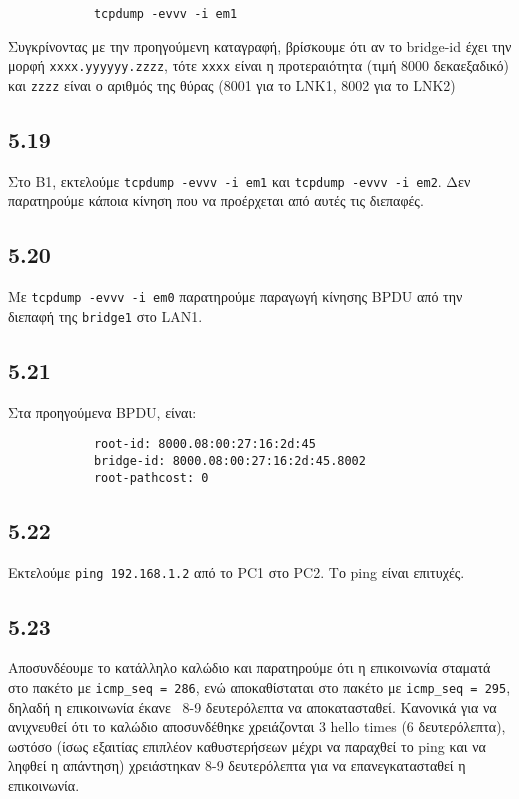 \documentclass[a4paper, 12pt]{article}
\begin{document}
		\begin{verbatim}
			tcpdump -evvv -i em1
		\end{verbatim}
		
		Συγκρίνοντας με την προηγούμενη καταγραφή, βρίσκουμε ότι αν το bridge-id έχει την μορφή \verb|xxxx.yyyyyy.zzzz|, τότε \verb|xxxx| είναι η προτεραιότητα (τιμή 8000 δεκαεξαδικό) και \verb|zzzz| είναι ο αριθμός της θύρας (8001 για το LNK1, 8002 για το LNK2)

	\subsection*{5.19}
		Στο B1, εκτελούμε \verb|tcpdump -evvv -i em1| και \verb|tcpdump -evvv -i em2|. Δεν παρατηρούμε κάποια κίνηση που να προέρχεται από αυτές τις διεπαφές.

	\subsection*{5.20}
		Με \verb|tcpdump -evvv -i em0| παρατηρούμε παραγωγή κίνησης BPDU από την διεπαφή της \verb|bridge1| στο LAN1.

	\subsection*{5.21}
		Στα προηγούμενα BPDU, είναι:
		
		\begin{verbatim}
			root-id: 8000.08:00:27:16:2d:45
			bridge-id: 8000.08:00:27:16:2d:45.8002
			root-pathcost: 0
		\end{verbatim}

	\subsection*{5.22}
		Εκτελούμε \verb|ping 192.168.1.2| από το PC1 στο PC2. Το ping είναι επιτυχές.

	\subsection*{5.23}
		Αποσυνδέουμε το κατάλληλο καλώδιο και παρατηρούμε ότι η επικοινωνία σταματά στο πακέτο με \verb|icmp_seq = 286|, ενώ αποκαθίσταται στο πακέτο με \verb|icmp_seq = 295|, δηλαδή η επικοινωνία έκανε ~8-9 δευτερόλεπτα να αποκατασταθεί. Κανονικά για να ανιχνευθεί ότι το καλώδιο αποσυνδέθηκε χρειάζονται 3 hello times (6 δευτερόλεπτα), ωστόσο (ίσως εξαιτίας επιπλέον καθυστερήσεων μέχρι να παραχθεί το ping και να ληφθεί η απάντηση) χρειάστηκαν 8-9 δευτερόλεπτα για να επανεγκατασταθεί η επικοινωνία.
\end{document}
